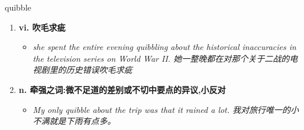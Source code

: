 
\begin{frame}
{\huge quibble}
\begin{center}
\begin{enumerate}\Large
  \item \textbf{vi. 吹毛求疵}
  \begin{itemize}
    \item \em{\Large{she spent the entire evening quibbling about the historical inaccuracies in the television series on World War II. 她一整晚都在对那个关于二战的电视剧里的历史错误吹毛求疵}}
  \end{itemize}
  \item \textbf{n. 牵强之词:微不足道的差别或不切中要点的异议,小反对}
  \begin{itemize}
    \item \em{\Large{My only quibble about the trip was that it rained a lot. 我对旅行唯一的小不满就是下雨有点多。}}
  \end{itemize}
\end{enumerate}
\end{center}
\end{frame}
